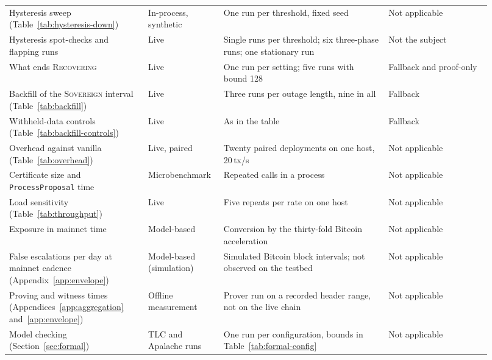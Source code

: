 {\begin{longtable}{@{}>{\raggedright\arraybackslash}p{0.27\linewidth}>{\raggedright\arraybackslash}p{0.13\linewidth}>{\raggedright\arraybackslash}p{0.32\linewidth}>{\raggedright\arraybackslash}p{0.20\linewidth}@{}}
Hysteresis sweep (Table~\ref{tab:hysteresis-down}) & In-process, synthetic & One run per threshold, fixed seed & Not applicable \\
Hysteresis spot-checks and flapping runs & Live & Single runs per threshold; six three-phase runs; one stationary run & Not the subject \\
What ends \textsc{Recovering} & Live & One run per setting; five runs with bound 128 & Fallback and proof-only \\
Backfill of the \textsc{Sovereign} interval (Table~\ref{tab:backfill}) & Live & Three runs per outage length, nine in all & Fallback \\
Withheld-data controls (Table~\ref{tab:backfill-controls}) & Live & As in the table & Fallback \\
Overhead against vanilla (Table~\ref{tab:overhead}) & Live, paired & Twenty paired deployments on one host, 20\,tx/s & Not applicable \\
Certificate size and \texttt{ProcessProposal} time & Microbenchmark & Repeated calls in a process & Not applicable \\
Load sensitivity (Table~\ref{tab:throughput}) & Live & Five repeats per rate on one host & Not applicable \\
Exposure in mainnet time & Model-based & Conversion by the thirty-fold Bitcoin acceleration & Not applicable \\
False escalations per day at mainnet cadence (Appendix~\ref{app:envelope}) & Model-based (simulation) & Simulated Bitcoin block intervals; not observed on the testbed & Not applicable \\
Proving and witness times (Appendices~\ref{app:aggregation} and~\ref{app:envelope}) & Offline measurement & Prover run on a recorded header range, not on the live chain & Not applicable \\
Model checking (Section~\ref{sec:formal}) & TLC and Apalache runs & One run per configuration, bounds in Table~\ref{tab:formal-config} & Not applicable \\
\end{longtable}
}
